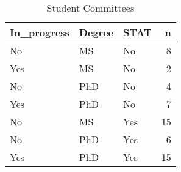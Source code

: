 \begin{table}[h]
\centering
\caption{Student Committees} 
\label{tab:committees}
\begin{tabular}{lllr}
  \hline
In\_progress & Degree & STAT & n \\ 
  \hline
No & MS & No &   8 \\ 
  Yes & MS & No &   2 \\ 
  No & PhD & No &   4 \\ 
  Yes & PhD & No &   7 \\ 
  No & MS & Yes &  15 \\ 
  No & PhD & Yes &   6 \\ 
  Yes & PhD & Yes &  15 \\ 
   \hline
\end{tabular}
\end{table}

